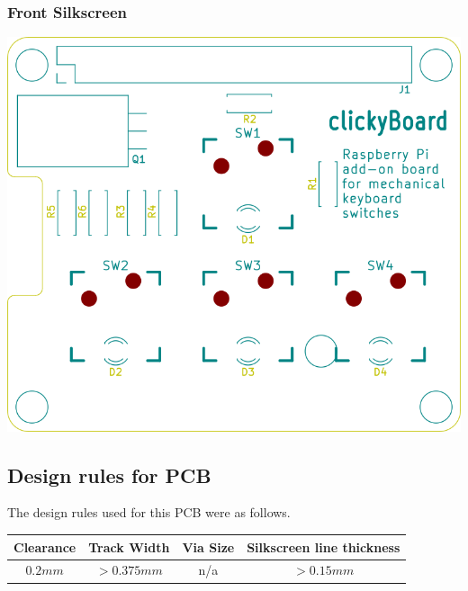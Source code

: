 \documentclass[10pt, a4paper, onesided]{article}
\begin{document}
		\subsubsection*{Front Silkscreen}
		\begin{center}
			\includegraphics[width=0.7\linewidth]{img/F_Ss}
		\end{center}
	
\subsection{Design rules for PCB}

	The design rules used for this PCB were as follows.
	
	\begin{tabular}{|c|c|c|c|}
		\hline 
		Clearance & Track Width & Via Size & Silkscreen line thickness \\ 
		\hline 
		$0.2 mm$ & $> 0.375 mm$ & n/a & $> 0.15 mm$ \\ 
		\hline 
	\end{tabular} 
	
\end{document}

